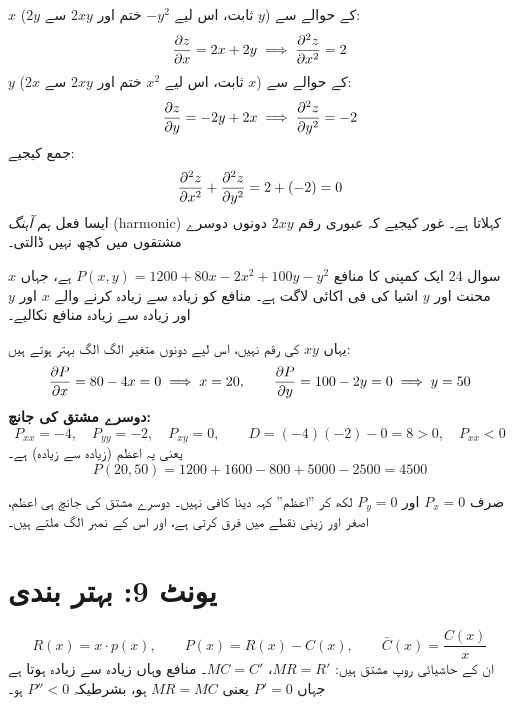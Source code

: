 \begin{hal}
\(x\) کے حوالے سے (\(y\) ثابت، اس لیے \(-y^{2}\) ختم اور \(2xy\) سے \(2y\)):
\[
\frac{\partial z}{\partial x}=2x+2y \;\Longrightarrow\; \frac{\partial^{2} z}{\partial x^{2}}=2
\]
\(y\) کے حوالے سے (\(x\) ثابت، اس لیے \(x^{2}\) ختم اور \(2xy\) سے \(2x\)):
\[
\frac{\partial z}{\partial y}=-2y+2x \;\Longrightarrow\; \frac{\partial^{2} z}{\partial y^{2}}=-2
\]
جمع کیجیے:
\[
\frac{\partial^{2} z}{\partial x^{2}}+\frac{\partial^{2} z}{\partial y^{2}}=2+(-2)=0
\]
ایسا فعل \emph{ہم آہنگ} (\textenglish{harmonic}) کہلاتا ہے۔ غور کیجیے کہ
عبوری رقم \(2xy\) دونوں دوسرے مشتقوں میں کچھ نہیں ڈالتی۔

\end{hal}

\begin{sawal}{سوال \textenglish{24}}
ایک کمپنی کا منافع \(P(x,y)=1200+80x-2x^{2}+100y-y^{2}\) ہے، جہاں \(x\) محنت
اور \(y\) اشیا کی فی اکائی لاگت ہے۔ منافع کو زیادہ سے زیادہ کرنے والے \(x\) اور
\(y\) اور زیادہ سے زیادہ منافع نکالیے۔
\end{sawal}

\begin{hal}
یہاں \(xy\) کی رقم نہیں، اس لیے دونوں متغیر الگ الگ بہتر ہوتے ہیں:
\[
\frac{\partial P}{\partial x}=80-4x=0 \;\Longrightarrow\; x=20,
\qquad
\frac{\partial P}{\partial y}=100-2y=0 \;\Longrightarrow\; y=50
\]
\textbf{دوسرے مشتق کی جانچ:}
\[
P_{xx}=-4,\quad P_{yy}=-2,\quad P_{xy}=0,
\qquad
D=(-4)(-2)-0=8>0,\quad P_{xx}<0
\]
یعنی یہ اعظم (زیادہ سے زیادہ) ہے۔
\[
P(20,50)=1200+1600-800+5000-2500=4500
\]

\end{hal}

\begin{ghalti}
صرف \(P_x=0\) اور \(P_y=0\) لکھ کر ''اعظم'' کہہ دینا کافی نہیں۔ دوسرے مشتق کی
جانچ ہی اعظم، اصغر اور زینی نقطے میں فرق کرتی ہے، اور اس کے نمبر الگ ملتے ہیں۔
\end{ghalti}

\section*{یونٹ \textenglish{9}: بہتر بندی}

\begin{nukta}
\[
R(x)=x\cdot p(x),\qquad
P(x)=R(x)-C(x),\qquad
\bar{C}(x)=\frac{C(x)}{x}
\]
ان کے حاشیائی روپ مشتق ہیں: \(MR=R'\)، \(MC=C'\)۔ منافع وہاں زیادہ سے زیادہ
ہوتا ہے جہاں \(P'=0\) یعنی \(MR=MC\) ہو، بشرطیکہ \(P''<0\) ہو۔
\end{nukta}

